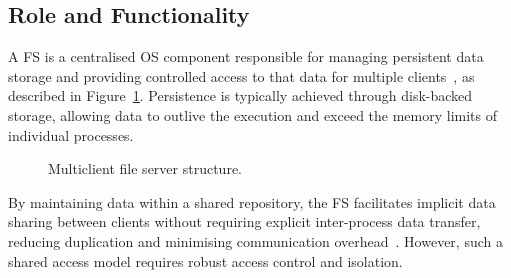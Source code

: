 \subsection{Role and Functionality}

A FS is a centralised OS component responsible for managing persistent data storage and providing controlled access to that data for multiple clients~\cite{tanenbaum_modern_2015}, as described in Figure~\ref{fig:file-server-structure}. Persistence is typically achieved through disk-backed storage, allowing data to outlive the execution and exceed the memory limits of individual processes. 
\vspace{0.8cm}
\begin{figure}[H]
\centering
{}
\caption{Multiclient file server structure.}
\label{fig:file-server-structure}
\end{figure}
\newpage

By maintaining data within a shared repository, the FS facilitates implicit data sharing between clients without requiring explicit inter-process data transfer, reducing duplication and minimising communication overhead~\cite{silberschatz2013operating}. However, such a shared access model requires robust access control and isolation.

